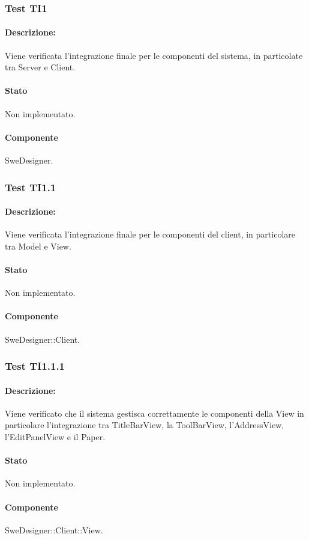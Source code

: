 \documentclass[../PianoDiQualifica.tex]{subfiles}
\begin{document}
	
	\subsubsection{Test TI1}
	\paragraph{Descrizione:} Viene verificata l'integrazione finale per le componenti del sistema, in particolate tra Server e Client.
	\paragraph{Stato} Non implementato.
	\paragraph{Componente} SweDesigner.
	\subsubsection{Test TI1.1}
	\paragraph{Descrizione:} Viene verificata l'integrazione finale per le componenti del client, in particolare tra  Model e View.
	\paragraph{Stato} Non implementato.
	\paragraph{Componente} SweDesigner::Client.
	\subsubsection{Test TI1.1.1}
	\paragraph{Descrizione:} Viene verificato che il sistema gestisca correttamente le componenti della View in particolare l'integrazione tra TitleBarView, la ToolBarView, l'AddressView, l'EditPanelView e il Paper.
	\paragraph{Stato} Non implementato.
	\paragraph{Componente} SweDesigner::Client::View.
	
\end{document}
